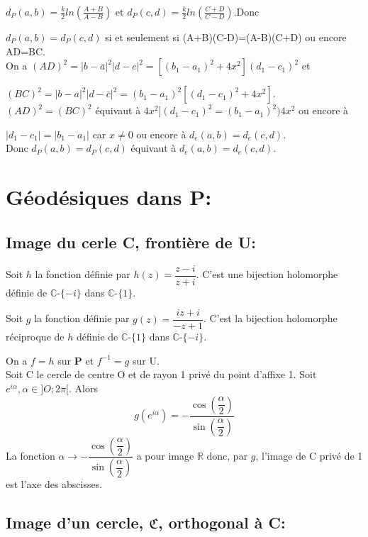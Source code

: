 \documentclass[a4paper, 12pt, twoside]{book}
\begin{document}
$d_{P}(a,b)=\frac{k}{2}ln(\frac{A+B}{A-B})$ et $d_{P}(c,d)=\frac{k}{2}ln(\frac{C+D}{C-D})$.Donc\

$d_{P}(a,b)=d_{P}(c,d)$ si et seulement si (A+B)(C-D)=(A-B)(C+D) ou encore AD=BC.\\

On a $(AD)^{2}=|b-\bar{a}|^{2}|d-c|^{2}=[(b_{1}-a_{1})^{2}+4x^{2}](d_{1}-c_{1})^{2}$ et\

$(BC)^{2}=|b-a|^{2}|d-\bar{c}|^{2}=(b_{1}-a_{1})^{2}[(d_{1}-c_{1})^{2}+4x^{2}]$.\\

$(AD)^{2}=(BC)^{2}$ équivaut à $4x^{2}](d_{1}-c_{1})^{2}=(b_{1}-a_{1})^{2})4x^{2}$ ou encore à\

$|d_{1}-c_{1}|=|b_{1}-a_{1}|$ car $x\neq0$ ou encore à $d_{e}(a, b)=d_{e}(c,d)$.\\

Donc $d_{P}(a,b)=d_{P}(c,d)$ équivaut à $d_{e}(a, b)=d_{e}(c,d)$.\\

  
\section{Géodésiques dans P:}

\subsection{Image du cerle C, frontière de U:}

Soit $h$ la fonction définie par $h(z)=\dfrac{z-i}{z+i}$. C'est une bijection holomorphe définie de $\mathbb{C}$-$\{-i\}$ dans $\mathbb{C}$-$\{1\}$.\

Soit $g$ la fonction définie par $g(z)=\dfrac{iz+i}{-z+1}$. C'est la bijection holomorphe réciproque de $h$ définie de $\mathbb{C}$-$\{1\}$ dans $\mathbb{C}$-$\{-i\}$.\

On a $f=h$ sur \textbf{P} et $f^{-1}=g$ sur U.\\

Soit C le cercle de centre O et de rayon 1 privé du point d'affixe 1. Soit $e^{i\alpha}, \alpha\in ]O; 2\pi[$. Alors $$g(e^{i\alpha})=-\dfrac{\cos(\dfrac{\alpha}{2})}{\sin(\dfrac{\alpha}{2})}$$
La fonction $\alpha\rightarrow-\dfrac{\cos(\dfrac{\alpha}{2})}{\sin(\dfrac{\alpha}{2})}$ a pour image $\mathbb{R}$ donc, par $g$, l'image de C privé de 1 est l'axe des abscisses.

\subsection{Image d'un cercle, $\mathfrak{C}$, orthogonal à C:}
\end{document}
